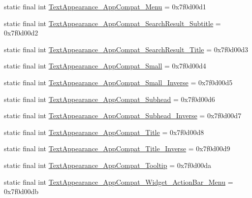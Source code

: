 \begin{DoxyCompactItemize}
\item 
static final int \mbox{\hyperlink{classcom_1_1synnapps_1_1carouselview_1_1_r_1_1style_a435e8ab2a58064fa346b3b7b32db8af5}{Text\+Appearance\+\_\+\+App\+Compat\+\_\+\+Menu}} = 0x7f0d00d1
\item 
static final int \mbox{\hyperlink{classcom_1_1synnapps_1_1carouselview_1_1_r_1_1style_af78c2b3dead0e92eee86c175acf3a8b8}{Text\+Appearance\+\_\+\+App\+Compat\+\_\+\+Search\+Result\+\_\+\+Subtitle}} = 0x7f0d00d2
\item 
static final int \mbox{\hyperlink{classcom_1_1synnapps_1_1carouselview_1_1_r_1_1style_a06fb8f3e8f8b3c1f73723b5957a3c6f3}{Text\+Appearance\+\_\+\+App\+Compat\+\_\+\+Search\+Result\+\_\+\+Title}} = 0x7f0d00d3
\item 
static final int \mbox{\hyperlink{classcom_1_1synnapps_1_1carouselview_1_1_r_1_1style_a36e6cacfeead27e4f47206a84045ec70}{Text\+Appearance\+\_\+\+App\+Compat\+\_\+\+Small}} = 0x7f0d00d4
\item 
static final int \mbox{\hyperlink{classcom_1_1synnapps_1_1carouselview_1_1_r_1_1style_a68fc948ac52f296d1480bc7706f501f5}{Text\+Appearance\+\_\+\+App\+Compat\+\_\+\+Small\+\_\+\+Inverse}} = 0x7f0d00d5
\item 
static final int \mbox{\hyperlink{classcom_1_1synnapps_1_1carouselview_1_1_r_1_1style_a4b75b6d5d53573c3395a409e90964a79}{Text\+Appearance\+\_\+\+App\+Compat\+\_\+\+Subhead}} = 0x7f0d00d6
\item 
static final int \mbox{\hyperlink{classcom_1_1synnapps_1_1carouselview_1_1_r_1_1style_a1c496e7b93b1900524098127b0870a58}{Text\+Appearance\+\_\+\+App\+Compat\+\_\+\+Subhead\+\_\+\+Inverse}} = 0x7f0d00d7
\item 
static final int \mbox{\hyperlink{classcom_1_1synnapps_1_1carouselview_1_1_r_1_1style_ad70c35deaa004dc35ea2609811c41448}{Text\+Appearance\+\_\+\+App\+Compat\+\_\+\+Title}} = 0x7f0d00d8
\item 
static final int \mbox{\hyperlink{classcom_1_1synnapps_1_1carouselview_1_1_r_1_1style_a5bdc1f4a0938125816d203772ebf5cf6}{Text\+Appearance\+\_\+\+App\+Compat\+\_\+\+Title\+\_\+\+Inverse}} = 0x7f0d00d9
\item 
static final int \mbox{\hyperlink{classcom_1_1synnapps_1_1carouselview_1_1_r_1_1style_aa1ea34b850c715219333d7ef4f666f2e}{Text\+Appearance\+\_\+\+App\+Compat\+\_\+\+Tooltip}} = 0x7f0d00da
\item 
static final int \mbox{\hyperlink{classcom_1_1synnapps_1_1carouselview_1_1_r_1_1style_ad7834e8c7045814a8744b2ea5e2881e4}{Text\+Appearance\+\_\+\+App\+Compat\+\_\+\+Widget\+\_\+\+Action\+Bar\+\_\+\+Menu}} = 0x7f0d00db

\end{DoxyCompactItemize}

